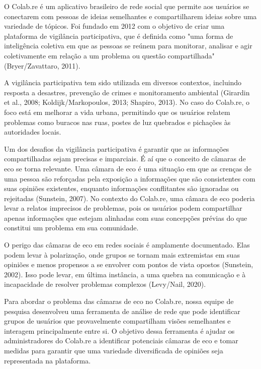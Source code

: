 O Colab.re é um aplicativo brasileiro de rede social que permite aos usuários se conectarem com pessoas de ideias semelhantes e compartilharem ideias sobre uma variedade de tópicos. Foi fundado em 2012 com o objetivo de criar uma plataforma de vigilância participativa, que é definida como "uma forma de inteligência coletiva em que as pessoas se reúnem para monitorar, analisar e agir coletivamente em relação a um problema ou questão compartilhada" (Bryer/Zavattaro, 2011).

A vigilância participativa tem sido utilizada em diversos contextos, incluindo resposta a desastres, prevenção de crimes e monitoramento ambiental (Girardin et al., 2008; Koldijk/Markopoulos, 2013; Shapiro, 2013). No caso do Colab.re, o foco está em melhorar a vida urbana, permitindo que os usuários relatem problemas como buracos nas ruas, postes de luz quebrados e pichações às autoridades locais.

Um dos desafios da vigilância participativa é garantir que as informações compartilhadas sejam precisas e imparciais. É aí que o conceito de câmaras de eco se torna relevante. Uma câmara de eco é uma situação em que as crenças de uma pessoa são reforçadas pela exposição a informações que são consistentes com suas opiniões existentes, enquanto informações conflitantes são ignoradas ou rejeitadas (Sunstein, 2007). No contexto do Colab.re, uma câmara de eco poderia levar a relatos imprecisos de problemas, pois os usuários podem compartilhar apenas informações que estejam alinhadas com suas concepções prévias do que constitui um problema em sua comunidade.

O perigo das câmaras de eco em redes sociais é amplamente documentado. Elas podem levar à polarização, onde grupos se tornam mais extremistas em suas opiniões e menos propensos a se envolver com pontos de vista opostos (Sunstein, 2002). Isso pode levar, em última instância, a uma quebra na comunicação e à incapacidade de resolver problemas complexos (Levy/Nail, 2020).

Para abordar o problema das câmaras de eco no Colab.re, nossa equipe de pesquisa desenvolveu uma ferramenta de análise de rede que pode identificar grupos de usuários que provavelmente compartilham visões semelhantes e interagem principalmente entre si. O objetivo dessa ferramenta é ajudar os administradores do Colab.re a identificar potenciais câmaras de eco e tomar medidas para garantir que uma variedade diversificada de opiniões seja representada na plataforma.